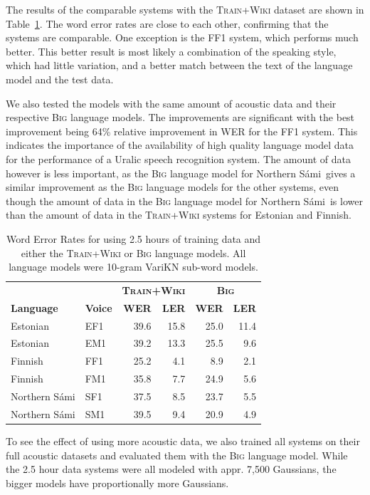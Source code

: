 \documentclass[b5paper]{article}
\newcommand{\ns}{Northern Sámi}
\newcommand{\ds}[1]{\textsc{#1}}
\begin{document}
The results of the comparable systems with the \ds{Train+Wiki} dataset are shown in Table~\ref{tbl:resultssmallcomp}. The word error rates are close to each other, confirming that the systems are comparable. One exception is the FF1 system, which performs much better. This better result is most likely a combination of the speaking style, which had little variation, and a better match between the text of the language model and the test data.

We also tested the models with the same amount of acoustic data and their respective \ds{Big} language models. The improvements are significant with the best improvement being 64\% relative improvement in WER for the FF1 system. This indicates the importance of the availability of high quality language model data for the performance of a Uralic speech recognition system. The amount of data however is less important, as the \ds{Big} language model for \ns\ gives a similar improvement as the \ds{Big} language models for the other systems, even though the amount of data in the \ds{Big} language model for \ns\ is lower than the amount of data in the \ds{Train+Wiki} systems for Estonian and Finnish.

\begin{table}
\centering
\begin{tabular}{ll|rr|rr}
 & & \multicolumn{2}{|c|}{\textbf{\ds{Train+Wiki}}}  & \multicolumn{2}{|c}{\textbf{\ds{Big}}}\\
\textbf{Language} & \textbf{Voice} & \textbf{WER} & \textbf{LER}& \textbf{{WER}} & \textbf{LER}\\\hline
Estonian & EF1 & 39.6 & 15.8 & 25.0 & 11.4\\
Estonian & EM1 & 39.2 & 13.3 & 25.5 & 9.6\\
Finnish & FF1 & 25.2 &4.1& 8.9 & 2.1  \\
Finnish & FM1 & 35.8 & 7.7 & 24.9 &  5.6 \\
\ns & SF1 & 37.5 & 8.5 & 23.7  & 5.5 \\
\ns & SM1 & 39.5 & 9.4& 20.9 & 4.9  \\
\end{tabular}
\caption{Word Error Rates for using 2.5 hours of training data and either the \ds{Train+Wiki} or \ds{Big} language models. All language models were 10-gram VariKN sub-word models.\label{tbl:resultssmallcomp}}
\end{table}

To see the effect of using more acoustic data, we also trained all systems on their full acoustic datasets and evaluated them with the \ds{Big} language model. While the 2.5 hour data systems were all modeled with appr. 7,500 Gaussians, the bigger models have proportionally more Gaussians. 
\end{document}
